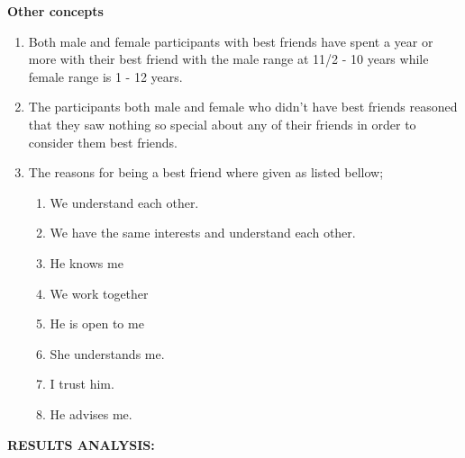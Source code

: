 \documentclass[11pt,a4paper,final]{report}
\begin{document}
\noindent 

\noindent \textbf{Other concepts}

\begin{enumerate}
\item \textbf{ }Both male and female participants with best friends have spent a year or more with their best friend with the male range at 11/2 - 10 years while female range is 1 - 12 years. 

\item  The participants both male and female who didn't have best friends reasoned that they saw nothing so special about any of their friends in order to consider them best friends.

\item  The reasons for being a best friend where given as listed bellow;
\begin{enumerate}

\item  We understand each other.

\item  We have the same interests and understand each other.

\item  He knows me

\item  We work together

\item  He is open to me

\item  She understands me.

\item  I trust him.

\item  He advises me.
\end{enumerate}
\end{enumerate}

\noindent 

\noindent \textbf{RESULTS ANALYSIS:}
\end{document}
